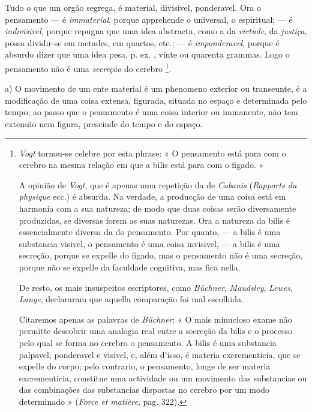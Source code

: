 Tudo o que um orgão segrega, é material, divisivel, ponderavel. Ora o pensamento --- é \emph{immaterial}, porque apprehende o universal, o espiritual; --- é \emph{indivisivel}, porque repugna que uma idea abstracta, como a da \emph{virtude}, da \emph{justiça}, possa dividir-se em metades, em quartos, etc.; --- é \emph{imponderavel}, porque é absurdo   dizer que uma idea pesa, p. ex. , vinte ou quarenta grammas. Logo o pensamento não é uma \emph{secreção} do cerebro \footnote{\emph{Vogt} tornou-se celebre por esta phrase: « O pensamento está para com o cerebro na mesma relação em que a bilis está para com o figado. »\par A opinião de \emph{Vogt}, que é apenas uma repetição da de \emph{Cabanis} (\emph{Rapports du physique} ecc.) é absurda. Na verdade, a producção de uma coisa está em harmonia com a sua natureza; de modo que duas coisas serão diversamente produzidas, se diversas forem as suas naturezas. Ora a natureza da bilis é essencialmente diversa da do pensamento. Por quanto, --- a bilis é uma substancia visivel, o pensamento é uma coisa invisivel, --- a bilis é uma secreção, porque se expelle do figado, mas o pensamento não é uma secreção, porque não se expelle da faculdade cognitiva, mas fica nella.\par De resto, os mais insuspeitos escriptores, como \emph{Büchner}, \emph{Maudsley}, \emph{Lewes}, \emph{Lange}, declararam que aquella comparação foi mal escolhida.\par Citaremos apenas as palavras de \emph{Büchner}: « O mais minucioso exame não permitte descobrir uma analogia real entre a secreção da bilis e o processo pelo qual se forma no cerebro o pensamento. A bilis é uma substancia palpavel, ponderavel e visivel, e, além d'isso, é materia excrementicia, que se expelle do corpo; pelo contrario, o pensamento, longe de ser materia excrementicia, constitue uma actividade ou um movimento das substancias ou das combinações das substancias dispostas no cerebro por um modo determinado » (\emph{Force et matière}, pag. 322).}.



a) O movimento de um ente material é um phenomeno exterior ou transeunte, é a modificação de uma coisa extensa, figurada, situada no espaço e determinada pelo tempo; ao passo que o pensamento é uma coisa interior ou immanente, não tem extensão nem figura, prescinde do tempo e do espaço.

